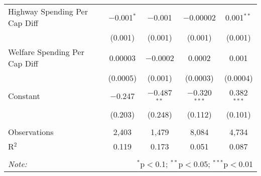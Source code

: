 \begin{table}[!htbp]
\begin{tabular}{@{\extracolsep{5pt}}lcccc}
  Highway Spending Per Cap Diff & $-$0.001$^{*}$ & $-$0.001 & $-$0.00002 & 0.001$^{**}$ \\ 
  & (0.001) & (0.001) & (0.001) & (0.001) \\ 
  Welfare Spending Per Cap Diff & 0.00003 & $-$0.0002 & 0.0002 & 0.001 \\ 
  & (0.0005) & (0.001) & (0.0003) & (0.0004) \\ 
  Constant & $-$0.247 & $-$0.487$^{**}$ & $-$0.320$^{***}$ & 0.382$^{***}$ \\ 
  & (0.203) & (0.248) & (0.112) & (0.101) \\ 
 \hline \\[-1.8ex] 
Observations & 2,403 & 1,479 & 8,084 & 4,734 \\ 
R$^{2}$ & 0.119 & 0.173 & 0.051 & 0.087 \\ 
\hline 
\hline \\[-1.8ex] 
\textit{Note:}  & \multicolumn{4}{r}{$^{*}$p$<$0.1; $^{**}$p$<$0.05; $^{***}$p$<$0.01} \\ 
\end{tabular} 
\end{table} 
